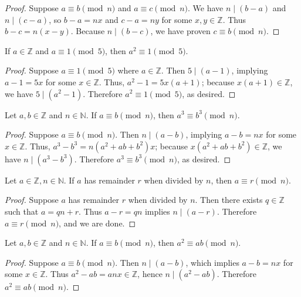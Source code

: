 \documentclass{exam}
\begin{document}
\begin{proof}
    Suppose $a\equiv b\pmod n$ and $a\equiv c \pmod n$. We have $n \mid (b-a)$ and $n\mid (c-a)$, so $b-a=nx$ and $c-a=ny$ for some $x, y\in\mathbb Z$. Thus $b-c = n(x-y)$. Because $n\mid (b-c)$, we have proven $c\equiv b\pmod n$.
\end{proof}

\begin{proposition}{5.20}
    If $a\in\mathbb Z$ and $a\equiv 1\pmod 5$, then $a^2\equiv 1\pmod 5$.
\end{proposition}

\begin{proof}
    Suppose $a\equiv1\pmod5$ where $a\in\mathbb Z$. Then $5\mid(a-1)$, implying $a-1 = 5x$ for some $x\in\mathbb Z$. Thus, $a^2-1=5x(a+1)$; because $x(a+1)\in\mathbb Z$, we have $5\mid(a^2-1)$. Therefore $a^2\equiv1\pmod5$, as desired.
\end{proof}

\begin{proposition}{5.21}
    Let $a,b\in\mathbb Z$ and $n\in\mathbb N$. If $a\equiv b\pmod n$, then $a^3\equiv b^3\pmod n$.
\end{proposition}

\begin{proof}
    Suppose $a\equiv b\pmod n$. Then $n\mid (a-b)$, implying $a-b=nx$ for some $x\in\mathbb Z$. Thus, $a^3-b^3 = n(a^2+ab+b^2)x$; because $x(a^2+ab+b^2) \in\mathbb Z$, we have $n\mid (a^3-b^3)$. Therefore $a^3\equiv b^3\pmod n$, as desired.
\end{proof}

\begin{proposition}{5.22}
    Let $a\in\mathbb Z, n\in\mathbb N$. If $a$ has remainder $r$ when divided by $n$, then $a\equiv r\pmod n$.
\end{proposition}

\begin{proof}
    Suppose $a$ has remainder $r$ when divided by $n$. Then there exists $q\in\mathbb Z$ such that $a=qn+r$. Thus $a-r = qn$ implies $n\mid (a-r)$. Therefore $a\equiv r\pmod n$, and we are done.
\end{proof}

\begin{proposition}{5.23}
    Let $a,b\in\mathbb Z$ and $n\in\mathbb N$. If $a\equiv b\pmod n$, then $a^2\equiv ab\pmod n$.
\end{proposition}

\begin{proof}
    Suppose $a\equiv b\pmod n$. Then $n\mid(a-b)$, which implies $a-b=nx$ for some $x\in\mathbb Z$. Thus $a^2-ab=anx \in\mathbb Z$, hence $n\mid(a^2-ab)$. Therefore $a^2\equiv ab\pmod n$.
\end{proof}
\end{document}
